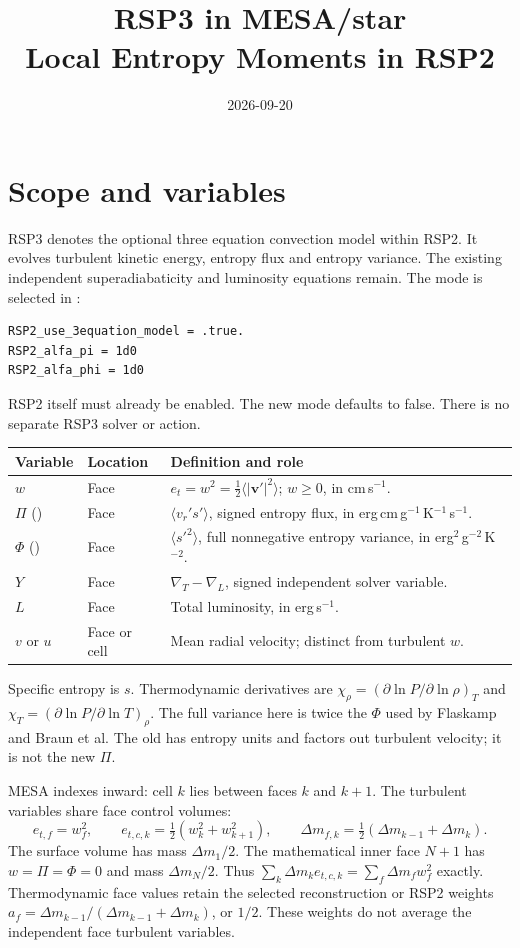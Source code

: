 \documentclass[11pt]{article}
\title{RSP3 in MESA/star\\Local Entropy Moments in RSP2}
\author{}
\date{2026-09-20}
\newcommand{\code}[1]{\texttt{\detokenize{#1}}}
\numberwithin{equation}{section}
\begin{document}
\maketitle
\vspace{-1.5em}

\section{Scope and variables}
RSP3 denotes the optional three equation convection model within RSP2.
It evolves turbulent kinetic energy, entropy flux and entropy variance.
The existing independent superadiabaticity and luminosity equations remain.
The mode is selected in \code{&controls}:
\begin{verbatim}
RSP2_use_3equation_model = .true.
RSP2_alfa_pi = 1d0
RSP2_alfa_phi = 1d0
\end{verbatim}
RSP2 itself must already be enabled. The new mode defaults to false.
There is no separate RSP3 solver or \code{star_job} action.

\begin{center}
\small
\begin{tabularx}{\linewidth}{@{}l l X@{}}
\toprule
Variable & Location & Definition and role\\
\midrule
$w$ & Face & $e_t=w^2=\tfrac12\langle|\boldsymbol v'|^2\rangle$;
 $w\geq0$, in cm\,s$^{-1}$.\\
$\Pi$ (\code{Pi}) & Face & $\langle v_r's'\rangle$, signed entropy flux,
 in erg\,cm\,g$^{-1}$\,K$^{-1}$\,s$^{-1}$.\\
$\Phi$ (\code{Phi}) & Face & $\langle s'^2\rangle$, full nonnegative entropy
 variance, in erg$^2$\,g$^{-2}$\,K$^{-2}$.\\
$Y$ & Face & $\nabla_T-\nabla_L$, signed independent solver variable.\\
$L$ & Face & Total luminosity, in erg\,s$^{-1}$.\\
$v$ or $u$ & Face or cell & Mean radial velocity; distinct from turbulent $w$.\\
\bottomrule
\end{tabularx}
\end{center}
Specific entropy is $s$. Thermodynamic derivatives are
$\chi_\rho=(\partial\ln P/\partial\ln\rho)_T$ and
$\chi_T=(\partial\ln P/\partial\ln T)_\rho$.
The full variance here is twice the $\Phi$ used by Flaskamp and Braun et al.
The old \code{PII} has entropy units and factors out turbulent velocity;
it is not the new $\Pi$.

MESA indexes inward: cell $k$ lies between faces $k$ and $k+1$.
The turbulent variables share face control volumes:
\begin{equation}
 e_{t,f}=w_f^2,\qquad e_{t,c,k}=\tfrac12(w_k^2+w_{k+1}^2),\qquad
 \Delta m_{f,k}=\tfrac12(\Delta m_{k-1}+\Delta m_k).
\end{equation}
The surface volume has mass $\Delta m_1/2$. The mathematical inner face
$N+1$ has $w=\Pi=\Phi=0$ and mass $\Delta m_N/2$.
Thus $\sum_k\Delta m_k e_{t,c,k}=\sum_f\Delta m_f w_f^2$ exactly.
Thermodynamic face values retain the selected reconstruction or RSP2
weights $a_f=\Delta m_{k-1}/(\Delta m_{k-1}+\Delta m_k)$, or $1/2$.
These weights do not average the independent face turbulent variables.
\end{document}
